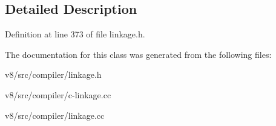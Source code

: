 \subsection{Detailed Description}


Definition at line 373 of file linkage.\+h.



The documentation for this class was generated from the following files\+:\begin{DoxyCompactItemize}
\item 
v8/src/compiler/linkage.\+h\item 
v8/src/compiler/c-\/linkage.\+cc\item 
v8/src/compiler/linkage.\+cc\end{DoxyCompactItemize}
